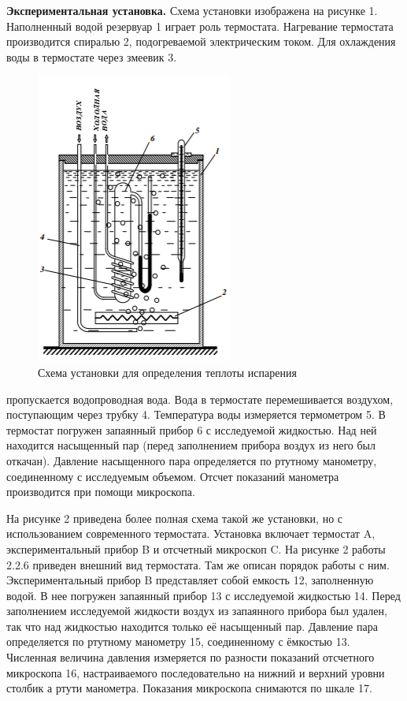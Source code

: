 \documentclass[a4paper,12pt]{article} %
\theoremstyle{plain} %
\theoremstyle{definition} %
\theoremstyle{remark} %
\begin{document}
\textbf{Экспериментальная
установка.} Схема установки изображена на рисунке 1.
Наполненный водой резервуар 1 играет роль термостата. Нагревание термостата производится спиралью 2, подогреваемой электрическим током. Для охлаждения воды в термостате через змеевик 3. 
\begin{figure}
	\includegraphics[scale=1]{im1}
	\caption{ {\small Схема установки для определения теплоты испарения}}
\end{figure}
пропускается водопроводная вода. Вода в термостате перемешивается воздухом,
поступающим через трубку 4.
Температура воды измеряется термометром 5.
В термостат погружен запаянный прибор 6 с исследуемой жидкостью. Над ней находится насыщенный пар (перед заполнением прибора воздух из него был откачан).
Давление насыщенного пара определяется по ртутному манометру, соединенному с исследуемым объемом. Отсчет показаний манометра
производится при помощи микроскопа.

На рисунке 2 приведена более полная схема такой
же установки, но с использованием современного термостата.
Установка включает термостат A, экспериментальный прибор B и отсчетный микроскоп C. На рисунке 2 работы 2.2.6 приведен внешний вид термостата. Там
же описан порядок работы с ним.
Экспериментальный прибор
B представляет собой емкость 12, заполненную водой.
В нее погружен запаянный прибор 13 с исследуемой жидкостью 14. Перед заполнением исследуемой жидкости воздух
из запаянного прибора был удален, так что над жидкостью находится только её насыщенный пар. Давление пара определяется по ртутному
манометру 15, соединенному с ёмкостью 13. Численная величина давления измеряется по разности показаний отсчетного микроскопа 16,
настраиваемого последовательно на нижний и верхний уровни столбик
а ртути манометра. Показания микроскопа снимаются по шкале 17.
\end{document}
